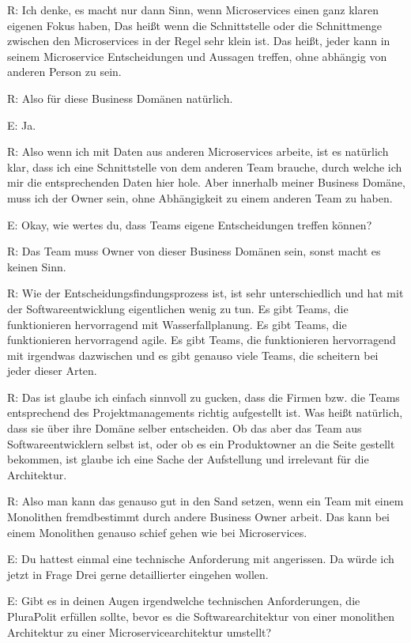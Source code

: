 R: Ich denke, es macht nur dann Sinn, wenn Microservices einen ganz klaren eigenen Fokus haben, Das heißt wenn die Schnittstelle oder die Schnittmenge zwischen den Microservices in der Regel sehr klein ist. Das heißt, jeder kann in seinem Microservice Entscheidungen und Aussagen treffen, ohne abhängig von anderen Person zu sein.

R: Also für diese Business Domänen natürlich. 

E: Ja.

R: Also wenn ich mit Daten aus anderen Microservices arbeite, ist es natürlich klar, dass ich eine Schnittstelle von dem anderen Team brauche, durch welche ich mir die entsprechenden Daten hier hole. Aber innerhalb meiner Business Domäne, muss ich der Owner sein, ohne Abhängigkeit zu einem anderen Team zu haben.

E: Okay, wie wertes du, dass Teams eigene Entscheidungen treffen können?

R: Das Team muss Owner von dieser Business Domänen sein, sonst macht es keinen Sinn.

R: Wie der Entscheidungsfindungsprozess ist, ist sehr unterschiedlich und hat mit der Softwareentwicklung eigentlichen wenig zu tun. Es gibt Teams, die funktionieren hervorragend mit Wasserfallplanung. Es gibt Teams, die funktionieren hervorragend agile. Es gibt Teams, die funktionieren hervorragend mit irgendwas dazwischen und es gibt genauso viele Teams, die scheitern bei jeder dieser Arten.

R: Das ist glaube ich einfach sinnvoll zu gucken, dass die Firmen bzw. die Teams entsprechend des Projektmanagements richtig aufgestellt ist. Was heißt natürlich, dass sie über ihre Domäne selber entscheiden. Ob das aber das Team aus Softwareentwicklern selbst ist, oder ob es ein  Produktowner an die Seite gestellt bekommen, ist glaube ich eine Sache der Aufstellung und irrelevant für die Architektur.

R: Also man kann das genauso gut in den Sand setzen, wenn ein Team mit einem Monolithen  fremdbestimmt durch andere Business Owner arbeit. Das kann bei einem Monolithen genauso schief gehen wie bei Microservices.

E: Du hattest einmal eine technische Anforderung mit angerissen. Da würde ich jetzt in Frage Drei gerne detaillierter eingehen wollen. 

E: Gibt es in deinen Augen irgendwelche technischen Anforderungen, die PluraPolit erfüllen sollte, bevor es die Softwarearchitektur von einer monolithen Architektur zu einer Microservicearchitektur umstellt? 

